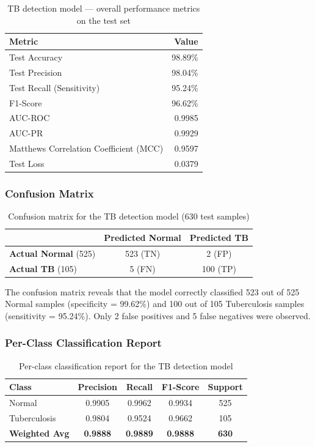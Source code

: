 \documentclass[12pt, a4paper, oneside]{report}
\begin{document}
\begin{table}[H]
\centering
\caption{TB detection model --- overall performance metrics on the test set}
\label{tab:tb_metrics}
\begin{tabular}{lr}
\toprule
\textbf{Metric} & \textbf{Value} \\
\midrule
Test Accuracy & 98.89\% \\
Test Precision & 98.04\% \\
Test Recall (Sensitivity) & 95.24\% \\
F1-Score & 96.62\% \\
AUC-ROC & 0.9985 \\
AUC-PR & 0.9929 \\
Matthews Correlation Coefficient (MCC) & 0.9597 \\
Test Loss & 0.0379 \\
\bottomrule
\end{tabular}
\end{table}

\subsubsection{Confusion Matrix}

\begin{table}[H]
\centering
\caption{Confusion matrix for the TB detection model (630 test samples)}
\label{tab:tb_confusion}
\begin{tabular}{lcc}
\toprule
& \textbf{Predicted Normal} & \textbf{Predicted TB} \\
\midrule
\textbf{Actual Normal} (525) & 523 (TN) & 2 (FP) \\
\textbf{Actual TB} (105) & 5 (FN) & 100 (TP) \\
\bottomrule
\end{tabular}
\end{table}

The confusion matrix reveals that the model correctly classified 523 out of 525 Normal samples (specificity = 99.62\%) and 100 out of 105 Tuberculosis samples (sensitivity = 95.24\%). Only 2 false positives and 5 false negatives were observed.

\subsubsection{Per-Class Classification Report}

\begin{table}[H]
\centering
\caption{Per-class classification report for the TB detection model}
\label{tab:tb_class_report}
\begin{tabular}{lcccc}
\toprule
\textbf{Class} & \textbf{Precision} & \textbf{Recall} & \textbf{F1-Score} & \textbf{Support} \\
\midrule
Normal & 0.9905 & 0.9962 & 0.9934 & 525 \\
Tuberculosis & 0.9804 & 0.9524 & 0.9662 & 105 \\
\midrule
\textbf{Weighted Avg} & \textbf{0.9888} & \textbf{0.9889} & \textbf{0.9888} & \textbf{630} \\
\bottomrule
\end{tabular}
\end{table}
\end{document}
